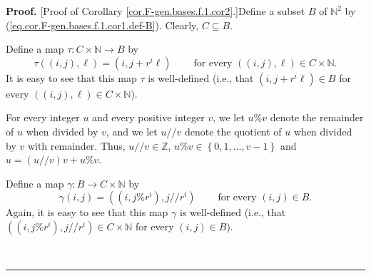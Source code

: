 \documentclass[numbers=enddot,12pt,final,onecolumn,notitlepage]{scrartcl}%
\theoremstyle{definition}
\newenvironment{proof}[1][Proof]{\noindent\textbf{#1.} }{\ \rule{0.5em}{0.5em}}
\begin{document}
\begin{proof}
[Proof of Corollary \ref{cor.F-gen.bases.f.1.cor2}.]Define a subset $B$ of
$\mathbb{N}^{2}$ by (\ref{eq.cor.F-gen.bases.f.1.cor1.def-B}). Clearly,
$C\subseteq B$.

Define a map $\tau:C\times\mathbb{N}\rightarrow B$ by
\[
\tau\left(  \left(  i,j\right)  ,\ell\right)  =\left(  i,j+r^{i}\ell\right)
\ \ \ \ \ \ \ \ \ \ \text{for every }\left(  \left(  i,j\right)  ,\ell\right)
\in C\times\mathbb{N}.
\]
It is easy to see that this map $\tau$ is well-defined (i.e., that $\left(
i,j+r^{i}\ell\right)  \in B$ for every $\left(  \left(  i,j\right)
,\ell\right)  \in C\times\mathbb{N}$).

For every integer $u$ and every positive integer $v$, we let $u\%v$ denote the
remainder of $u$ when divided by $v$, and we let $u//v$ denote the quotient of
$u$ when divided by $v$ with remainder. Thus, $u//v\in\mathbb{Z}$,
$u\%v\in\left\{  0,1,\ldots,v-1\right\}  $ and $u=\left(  u//v\right)  v+u\%v$.

Define a map $\gamma:B\rightarrow C\times\mathbb{N}$ by%
\[
\gamma\left(  i,j\right)  =\left(  \left(  i,j\%r^{i}\right)  ,j//r^{i}%
\right)  \ \ \ \ \ \ \ \ \ \ \text{for every }\left(  i,j\right)  \in B.
\]
Again, it is easy to see that this map $\gamma$ is well-defined (i.e., that
$\left(  \left(  i,j\%r^{i}\right)  ,j//r^{i}\right)  \in C\times\mathbb{N}$
for every $\left(  i,j\right)  \in B$).


\end{proof}
\end{document}
